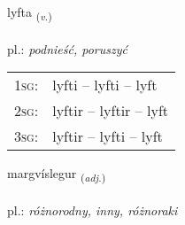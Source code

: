 \documentclass[frontgrid, backgrid]{flacards}\usepackage[]{graphicx}\usepackage[]{xcolor}
\begin{document}
\renewcommand{\flhead}{\vskip5pt \fboxsep=0pt {\small\bfseries\footnotesize Sagnorð | Verb}}
\renewcommand{\fcfoot}{\vskip5pt \fboxsep=0pt \hspace{2pt}{\small\bfseries\footnotesize 2K}}

\renewcommand{\blhead}{\vskip5pt {\small\bfseries\footnotesize Sagnorð | Verb }}
\renewcommand{\bcfoot}{\vskip5pt \hspace{2pt}{\small\bfseries\footnotesize 2K}}


{lyfta \small{\textsubscript{(\textit{v.})}} \\[1ex] %
\textphonetic{[lɪfta]} \\
pl.: \emph{podnieść, poruszyć} \\  [2ex]
\renewcommand*{\arraystretch}{0.8}
\begin{tabular}{p{1cm}l}
\textsc{1sg}: & lyfti -- lyfti -- lyft \\ 
\textsc{2sg}: & lyftir -- lyftir -- lyft \\ 
\textsc{3sg}: & lyftir -- lyfti -- lyft \\ 
\end{tabular}
}

\renewcommand{\flhead}{\vskip5pt \fboxsep=0pt {\small\bfseries\footnotesize Lýsingarorð | Adjective}}
\renewcommand{\fcfoot}{\vskip5pt \fboxsep=0pt \hspace{2pt}{\small\bfseries\footnotesize 2K}}

\renewcommand{\blhead}{\vskip5pt {\small\bfseries\footnotesize Lýsingarorð | Adjective }}
\renewcommand{\bcfoot}{\vskip5pt \hspace{2pt}{\small\bfseries\footnotesize 2K}}


{margvíslegur \small{\textsubscript{(\textit{adj.})}} \\[1ex] %
\textphonetic{[markvistlɛɣʏr]} \\
pl.: \emph{różnorodny, inny, różnoraki} \\  [2ex]
\renewcommand*{\arraystretch}{0.8}
}
\end{document}
